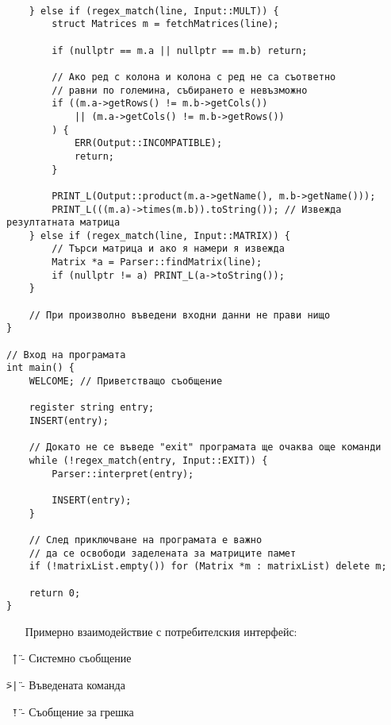 \documentclass[oneside]{book}
\newcommand*{\code}[1]{\texttt{#1}}
\begin{document}
\begin{mdframed}\begin{lstlisting}[firstnumber=last]

	} else if (regex_match(line, Input::MULT)) {
		struct Matrices m = fetchMatrices(line);

		if (nullptr == m.a || nullptr == m.b) return;

		// Ако ред с колона и колона с ред не са съответно
		// равни по големина, събирането е невъзможно
		if ((m.a->getRows() != m.b->getCols())
			|| (m.a->getCols() != m.b->getRows())
		) {
			ERR(Output::INCOMPATIBLE);
			return;
		}

		PRINT_L(Output::product(m.a->getName(), m.b->getName()));
		PRINT_L(((m.a)->times(m.b)).toString()); // Извежда резултатната матрица
	} else if (regex_match(line, Input::MATRIX)) {
		// Търси матрица и ако я намери я извежда
		Matrix *a = Parser::findMatrix(line);
		if (nullptr != a) PRINT_L(a->toString());
	}

	// При произволно въведени входни данни не прави нищо
}

// Вход на програмата
int main() {
	WELCOME; // Приветстващо съобщение

	register string entry;
	INSERT(entry);

	// Докато не се въведе "exit" програмата ще очаква още команди
	while (!regex_match(entry, Input::EXIT)) {
		Parser::interpret(entry);

		INSERT(entry);
	}

	// След приключване на програмата е важно
	// да се освободи заделената за матриците памет
	if (!matrixList.empty()) for (Matrix *m : matrixList) delete m;

	return 0;
}
\end{lstlisting}\end{mdframed}

\begin{itemize}\item[Примерно] взаимодействие с потребителския интерфейс:\end{itemize}

\code{\"\ |\"} - Системно съобщение

\code{\"}\code{>|\"} - Въведената команда

\code{\"\ !\"} - Съобщение за грешка
\end{document}
